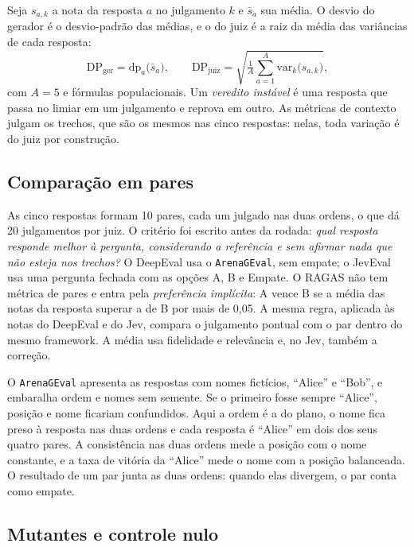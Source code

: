 \documentclass[12pt]{article}
\newcommand{\code}[1]{\texttt{\small #1}}
\newcommand{\dpg}{\mathrm{DP}_{\mathrm{ger}}}
\newcommand{\dpj}{\mathrm{DP}_{\mathrm{juiz}}}
\begin{document}
Seja $s_{a,k}$ a nota da resposta $a$ no julgamento $k$ e $\bar{s}_a$ sua média. O
desvio do gerador é o desvio-padrão das médias, e o do juiz é a raiz da média das
variâncias de cada resposta:
\begin{equation}
\label{eq:dp}
\dpg = \mathrm{dp}_a\bigl(\bar{s}_a\bigr), \qquad
\dpj = \sqrt{\tfrac{1}{A}\textstyle\sum_{a=1}^{A} \mathrm{var}_k\bigl(s_{a,k}\bigr)},
\end{equation}
com $A = 5$ e fórmulas populacionais. Um \emph{veredito instável} é uma resposta
que passa no limiar em um julgamento e reprova em outro. As métricas de contexto
julgam os trechos, que são os mesmos nas cinco respostas: nelas, toda variação é do
juiz por construção.

\subsection{Comparação em pares}
\label{sec:pares}

As cinco respostas formam 10 pares, cada um julgado nas duas ordens, o que dá 20
julgamentos por juiz. O critério foi escrito antes da rodada: \emph{qual resposta
responde melhor à pergunta, considerando a referência e sem afirmar nada que não
esteja nos trechos?} O DeepEval usa o \code{ArenaGEval}, sem empate; o JevEval usa
uma pergunta fechada com as opções A, B e Empate. O RAGAS não tem métrica de pares
e entra pela \emph{preferência implícita}: A vence B se a média das notas da
resposta superar a de B por mais de 0,05. A mesma regra, aplicada às notas do
DeepEval e do Jev, compara o julgamento pontual com o par dentro do mesmo
framework. A média usa fidelidade e relevância e, no Jev, também a correção.

O \code{ArenaGEval} apresenta as respostas com nomes fictícios, ``Alice'' e
``Bob'', e embaralha ordem e nomes sem semente. Se o primeiro fosse sempre
``Alice'', posição e nome ficariam confundidos. Aqui a ordem é a do plano, o nome
fica preso à resposta nas duas ordens e cada resposta é ``Alice'' em dois dos seus
quatro pares. A consistência nas duas ordens mede a posição com o nome constante, e
a taxa de vitória da ``Alice'' mede o nome com a posição balanceada. O resultado de um
par junta as duas ordens: quando elas divergem, o par conta como empate.

\subsection{Mutantes e controle nulo}
\label{sec:mutantes}
\end{document}
